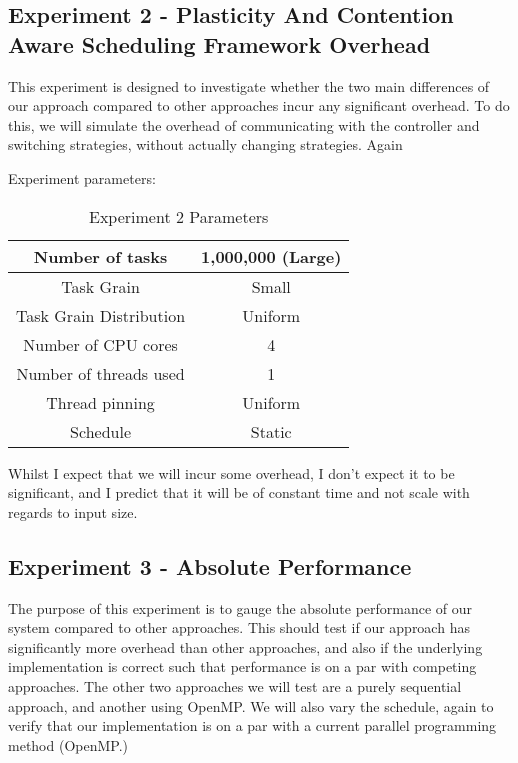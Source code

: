 \subsection{Experiment 2 - Plasticity And Contention Aware Scheduling Framework Overhead}

This experiment is designed to investigate whether the two main differences of our approach compared to other approaches incur any significant overhead. To do this, we will simulate the overhead of communicating with the controller and switching strategies, without actually changing strategies. Again



Experiment parameters:

\begin{table}
\centering
	\begin{tabular}{|c|c|}
		\hline
		Number of tasks & 1,000,000 (Large) \\
		\hline
		Task Grain & Small \\
		\hline
		Task Grain Distribution & Uniform \\
		\hline
		Number of CPU cores & 4 \\
		\hline
		Number of threads used & 1 \\
		\hline
		Thread pinning & Uniform \\
		\hline
		Schedule & Static \\
		\hline
	\end{tabular}
\caption{Experiment 2 Parameters}
\label{table:ex2_parameters}
\end{table}



Whilst I expect that we will incur some overhead, I don't expect it to be significant, and I predict that it will be of constant time and not scale with regards to input size.



\subsection{Experiment 3 - Absolute Performance}

The purpose of this experiment is to gauge the absolute performance of our system compared to other approaches. This should test if our approach has significantly more overhead than other approaches, and also if the underlying implementation is correct such that performance is on a par with competing approaches. The other two approaches we will test are a purely sequential approach, and another using OpenMP. We will also vary the schedule, again to verify that our implementation is on a par with a current parallel programming method (OpenMP.)

